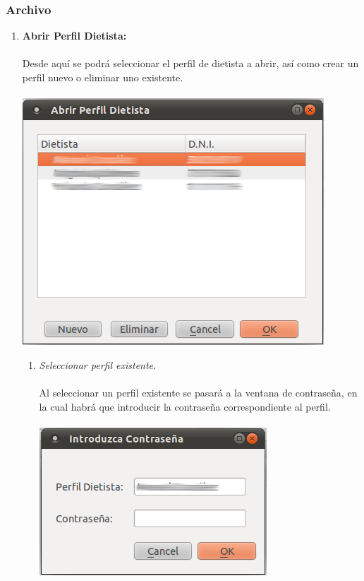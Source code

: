 \documentclass[12pt, spanish]{article}
\begin{document}
\subsubsection{Archivo}
\begin{enumerate}
\item \textbf{Abrir Perfil Dietista:}\\\\
Desde aquí se podrá seleccionar el perfil de dietista a abrir, así como crear un perfil nuevo o eliminar uno existente.\\\\
\includegraphics[scale=0.5]{Image/dietista-abrir.png}
\begin{enumerate}
\item \textit{Seleccionar perfil existente.}\\\\
Al seleccionar un perfil existente se pasará a la ventana de contraseña, en la cual habrá que introducir la contraseña correspondiente al perfil.\\\\
\includegraphics[scale=0.5]{Image/dietista-passwd.png}

\end{enumerate}
\end{enumerate}
\end{document}
